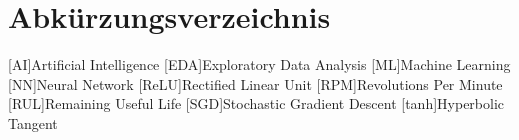 \chapter*{Abkürzungsverzeichnis} 

\begin{acronym}
	
	[AI]{Artificial Intelligence}
	[EDA]{Exploratory Data Analysis}
	[ML]{Machine Learning}
	[NN]{Neural Network}
	[ReLU]{Rectified Linear Unit}
	[RPM]{Revolutions Per Minute}
	[RUL]{Remaining Useful Life}
	[SGD]{Stochastic Gradient Descent}
	[tanh]{Hyperbolic Tangent}
	
\end{acronym}
